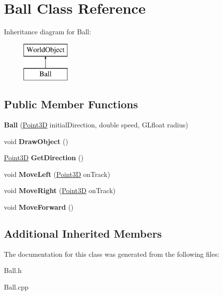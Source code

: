 \hypertarget{class_ball}{\section{Ball Class Reference}
\label{class_ball}
}
Inheritance diagram for Ball\+:\begin{figure}[H]
\begin{center}
\leavevmode
\includegraphics[height=2.000000cm]{class_ball}
\end{center}
\end{figure}
\subsection*{Public Member Functions}
\begin{DoxyCompactItemize}
\item 
\hypertarget{class_ball_a5b02c078ccc7dc50db406cc6afee22cd}{{\bfseries Ball} (\hyperlink{struct_point3_d}{Point3\+D} initial\+Direction, double speed, G\+Lfloat radius)}\label{class_ball_a5b02c078ccc7dc50db406cc6afee22cd}

\item 
\hypertarget{class_ball_a6bc4fe06d40ae8bb833cd758a6bca1ab}{void {\bfseries Draw\+Object} ()}\label{class_ball_a6bc4fe06d40ae8bb833cd758a6bca1ab}

\item 
\hypertarget{class_ball_ad4e6eac0cd9afd3d2be2267d6befe18a}{\hyperlink{struct_point3_d}{Point3\+D} {\bfseries Get\+Direction} ()}\label{class_ball_ad4e6eac0cd9afd3d2be2267d6befe18a}

\item 
\hypertarget{class_ball_ad56e662d67b4135c43cd637be246cf78}{void {\bfseries Move\+Left} (\hyperlink{struct_point3_d}{Point3\+D} on\+Track)}\label{class_ball_ad56e662d67b4135c43cd637be246cf78}

\item 
\hypertarget{class_ball_ace7571918ebb61526c6b30b7a2ecb711}{void {\bfseries Move\+Right} (\hyperlink{struct_point3_d}{Point3\+D} on\+Track)}\label{class_ball_ace7571918ebb61526c6b30b7a2ecb711}

\item 
\hypertarget{class_ball_a61798e313a118de5943221531255cf7a}{void {\bfseries Move\+Forward} ()}\label{class_ball_a61798e313a118de5943221531255cf7a}

\end{DoxyCompactItemize}
\subsection*{Additional Inherited Members}


The documentation for this class was generated from the following files\+:\begin{DoxyCompactItemize}
\item 
Ball.\+h\item 
Ball.\+cpp\end{DoxyCompactItemize}
